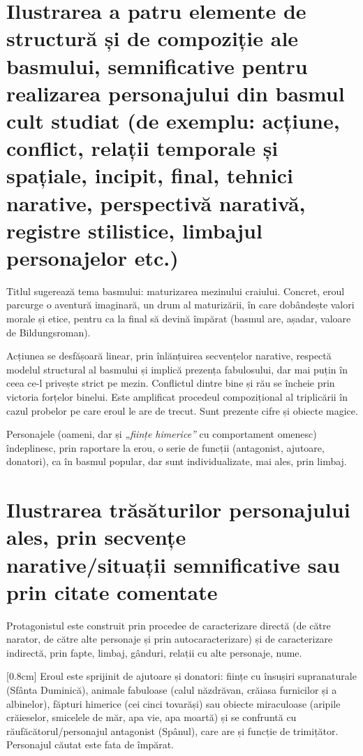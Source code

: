 \documentclass[
12pt,
a4paper
]{article}
\begin{document}
\section{Ilustrarea a patru elemente de structură și de compoziție ale basmului, semnificative pentru realizarea personajului din basmul cult studiat {\footnotesize(de exemplu: acțiune, conflict, relații temporale și spațiale, incipit, final, tehnici narative, perspectivă narativă, registre stilistice, limbajul personajelor etc.)}}

Titlul sugerează tema basmului: maturizarea mezinului craiului. Concret, eroul parcurge o aventură imaginară, un drum al maturizării, în care dobândește valori morale și etice, pentru ca la final să devină împărat (basmul are, așadar, valoare de Bildungsroman).

Acțiunea se desfășoară linear, prin înlănțuirea secvențelor narative, respectă modelul structural al basmului și implică prezența fabulosului, dar mai puțin în ceea ce-l privește strict pe mezin. Conflictul dintre bine și rău se încheie prin victoria forțelor binelui. Este amplificat procedeul compozițional al triplicării în cazul probelor pe care eroul le are de trecut. Sunt prezente cifre și obiecte magice.

Personajele (oameni, dar și \textit{„ființe himerice”} cu comportament omenesc) îndeplinesc, prin raportare la erou, o serie de funcții (antagonist, ajutoare, donatori), ca în basmul popular, dar sunt individualizate, mai ales, prin limbaj.

\section{Ilustrarea trăsăturilor personajului ales, prin secvențe \\ narative/situații semnificative sau prin citate comentate}

Protagonistul este construit prin procedee de caracterizare directă (de către narator, de către alte personaje și prin autocaracterizare) și de caracterizare indirectă, prin fapte, limbaj, gânduri, relații cu alte personaje, nume.

[0.8cm]
Eroul este sprijinit de ajutoare și donatori: ființe cu însușiri supranaturale (Sfânta Duminică), animale fabuloase (calul năzdrăvan, crăiasa furnicilor și a albinelor), făpturi himerice (cei cinci tovarăși) sau obiecte miraculoase (aripile crăieselor, smicelele de măr, apa vie, apa moartă) și se confruntă cu răufăcătorul/personajul antagonist (Spânul), care are și funcție de trimițător. Personajul căutat este fata de împărat.
\end{document}
